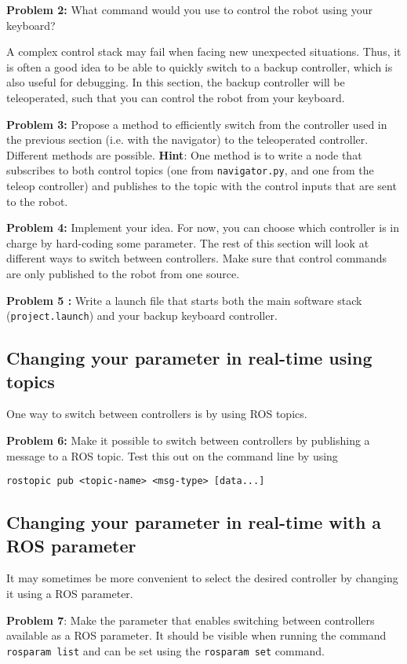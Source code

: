 \documentclass{article}
\begin{document}
\textbf{Problem 2: } What command would you use to control the robot using your keyboard? 

A complex control stack may fail when facing new unexpected situations. Thus, it is often a good idea to be able to quickly switch to a backup controller, which is also useful for debugging. In this section, the backup controller will be teleoperated, such that you can control the robot from your keyboard. 

\textbf{Problem 3: } Propose a method to efficiently switch from the controller used in the previous section (i.e. with the navigator) to the teleoperated controller. Different methods are possible.
\textbf{Hint}: One method is to write a node that subscribes to both control topics (one from \texttt{navigator.py}, and one from the teleop controller) and publishes to the topic with the control inputs that are sent to the robot.

\textbf{Problem 4: } Implement your idea. For now, you can choose which controller is in charge by hard-coding some parameter. The rest of this section will look at different ways to switch between controllers. Make sure that control commands are only published to the robot from one source.

\textbf{Problem 5 : } Write a launch file that starts both the main software stack (\texttt{project.launch}) and your backup keyboard controller. 

\subsection{Changing your parameter in real-time using topics}
One way to switch between controllers is by using ROS topics.

\textbf{Problem 6: } Make it possible to switch between controllers by publishing a message to a ROS topic. Test this out on the command line by using
\begin{lstlisting}
rostopic pub <topic-name> <msg-type> [data...]
\end{lstlisting}

\subsection{Changing your parameter in real-time with a ROS parameter}
It may sometimes be more convenient to select the desired controller by changing it using a ROS parameter.

\textbf{Problem 7}: Make the parameter that enables switching between controllers available as a ROS parameter. It should be visible when running the command \texttt{rosparam list} and can be set using the \texttt{rosparam set} command.
\end{document}
